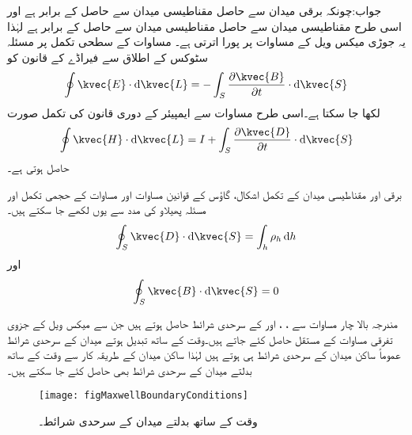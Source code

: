جواب:چونکہ برقی میدان سے حاصل  مقناطیسی میدان سے حاصل  کے برابر ہے اور اسی طرح مقناطیسی میدان سے حاصل   مقناطیسی میدان سے حاصل  کے برابر ہے لہٰذا یہ جوڑی میکس ویل کے مساوات پر پورا اترتی ہے۔
 مساوات  کے سطحی تکمل پر مسئلہ سٹوکس کے اطلاق سے فیراڈے کے  قانون کو
\begin{align}\label{مساوات_میکس_ویل_تکمل_مساوات_الف}
\oint \kvec{E} \cdot \dif \kvec{L}=-\int_S \frac{\partial \kvec{B}}{\partial t} \cdot \dif \kvec{S}
\end{align}
لکھا جا سکتا ہے۔اسی طرح مساوات  سے ایمپیئر کے دوری قانون کی تکمل صورت
\begin{align}\label{مساوات_میکس_ویل_تکمل_مساوات_ب}
\oint \kvec{H} \cdot \dif \kvec{L}=I+\int_S \frac{\partial \kvec{D}}{\partial t} \cdot \dif \kvec{S}
\end{align}
حاصل ہوتی ہے۔

برقی اور مقناطیسی میدان کے تکمل اشکال، گاؤس کے قوانین مساوات  اور مساوات  کے حجمی تکمل اور مسئلہ پھیلاو کی مدد سے یوں لکھے جا سکتے ہیں۔ 
\begin{align}\label{مساوات_میکس_ویل_تکمل_مساوات_پ}
\oint_S \kvec{D} \cdot \dif \kvec{S}=\int_h \rho_h \dif h
\end{align}
اور
\begin{align}\label{مساوات_میکس_ویل_تکمل_مساوات_ت}
\oint_S \kvec{B} \cdot \dif \kvec{S}=0
\end{align}

مندرجہ بالا چار مساوات سے ، ،  اور  کے سرحدی شرائط حاصل ہوتے ہیں جن سے میکس ویل کے جزوی تفرقی مساوات کے مستقل حاصل کئے جاتے ہیں۔وقت کے ساتھ تبدیل ہوتے میدان کے سرحدی شرائط عموماً ساکن میدان کے سرحدی شرائط ہی ہوتے ہیں لہٰذا ساکن میدان کے طریقہ کار سے وقت کے ساتھ بدلتے میدان کے سرحدی شرائط بھی حاصل کئے جا سکتے ہیں۔

\begin{figure}
\centering
\texttt{[image: figMaxwellBoundaryConditions]}
\caption{وقت کے ساتھ بدلتے میدان کے سرحدی شرائط۔}
\label{شکل_میکس_ویل_سرحدی_شرائط}
\end{figure}

